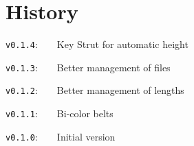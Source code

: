 \documentclass[english,11pt,a4paper]{article}
\begin{document}
\begin{demohigh}[language=latex/latex2,style/main=cyan!10,style/code=cyan!10]
{\Huge{}\:
}
\end{demohigh}

\begin{demohigh}[language=latex/latex2,style/main=cyan!10,style/code=cyan!10]
\par
{}\par
{}
\end{demohigh}

\vfill

\section{History}

\verb|v0.1.4|:~~~~Key \textsf{Strut} for automatic height

\verb|v0.1.3|:~~~~Better management of files

\verb|v0.1.2|:~~~~Better management of lengths

\verb|v0.1.1|:~~~~Bi-color belts

\verb|v0.1.0|:~~~~Initial version

\vspace*{15mm}
\end{document}
